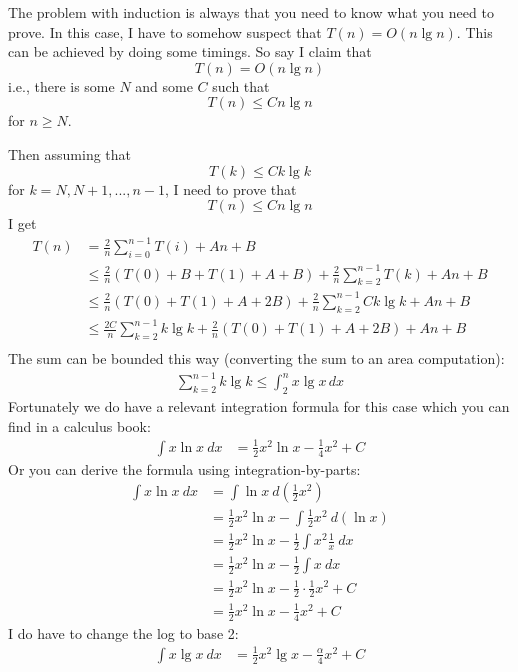 The problem with induction is always that you need to know what you need to prove.
In this case, I have to somehow suspect that
$T(n) = O(n \lg n)$.
This can be achieved by doing some timings.
So say I claim that
\[
  T(n) = O(n \lg n)
\]
i.e., there is some $N$ and some $C$ such that
\[
  T(n) \leq Cn \lg n
\]
for $n \geq N$.


Then assuming that
\[
  T(k) \leq C k \lg k
\]
for $k = N, N + 1, ..., n - 1$, I need to prove that
\[
  T(n) \leq C n \lg n
\]
I get
\begin{align*}
  T(n)
  &= \frac{2}{n} \sum_{i = 0}^{n - 1} T(i) + An + B
  \\
  &\leq \frac{2}{n}
    \left( T(0) + B + T(1) + A + B \right)
    +
    \frac{2}{n} \sum_{k = 2}^{n - 1} T(k)
    + An + B
  \\
  &\leq \frac{2}{n}
    \left( T(0) + T(1) + A + 2B \right)
    +
    \frac{2}{n} \sum_{k = 2}^{n - 1} C k \lg k
    + An + B
  \\
  &\leq
    \frac{2C}{n} \sum_{k = 2}^{n - 1} k \lg k
    + \frac{2}{n}
    \left( T(0) + T(1) + A + 2B \right)
    +
    An + B
  \\
\end{align*}
The sum can be bounded this way (converting the sum to an
area computation):
\begin{align*}
  \sum_{k = 2}^{n - 1} k \lg k
  \leq
  \int_{2}^n x \lg x \, dx
\end{align*}
Fortunately we do have a relevant integration formula for this case
which you can find in a calculus book:
\begin{align*}
  \int x \ln x \ dx
  &= \frac{1}{2}x^2 \ln x - \frac{1}{4}x^2 + C 
\end{align*}
Or you can derive the formula using integration-by-parts:
\begin{align*}
  \int x \ln x \ dx
  &= \int \ln x \ d \left( \frac{1}{2} x^2  \right)
  \\
  &= \frac{1}{2}x^2 \ln x - \int \frac{1}{2}x^2 \ d( \ln x )
  \\
  &= \frac{1}{2}x^2 \ln x - \frac{1}{2} \int x^2 \frac{1}{x} \ dx
  \\
  &= \frac{1}{2}x^2 \ln x - \frac{1}{2} \int x \ dx
  \\
  &= \frac{1}{2}x^2 \ln x - \frac{1}{2} \cdot \frac{1}{2} x^2 + C 
  \\
  &= \frac{1}{2}x^2 \ln x - \frac{1}{4}x^2 + C 
\end{align*}
I do have to change the log to base 2:
\begin{align*}
  \int x \lg x \ dx
  &= \frac{1}{2}x^2 \lg x - \frac{\alpha}{4}x^2 + C 
\end{align*}
